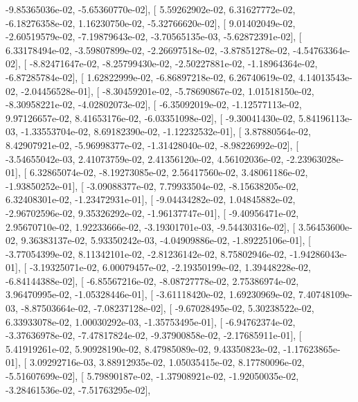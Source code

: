 \documentclass{article}
\begin{document}
         -9.85365036e-02,  -5.65360770e-02],
       [  5.59262902e-02,   6.31627772e-02,  -6.18276358e-02,
          1.16230750e-02,  -5.32766620e-02],
       [  9.01402049e-02,  -2.60519579e-02,  -7.19879643e-02,
         -3.70565135e-03,  -5.62872391e-02],
       [  6.33178494e-02,  -3.59807899e-02,  -2.26697518e-02,
         -3.87851278e-02,  -4.54763364e-02],
       [ -8.82471647e-02,  -8.25799430e-02,  -2.50227881e-02,
         -1.18964364e-02,  -6.87285784e-02],
       [  1.62822999e-02,  -6.86897218e-02,   6.26740619e-02,
          4.14013543e-02,  -2.04456528e-01],
       [ -8.30459201e-02,  -5.78690867e-02,   1.01518150e-02,
         -8.30958221e-02,  -4.02802073e-02],
       [ -6.35092019e-02,  -1.12577113e-02,   9.97126657e-02,
          8.41653176e-02,  -6.03351098e-02],
       [ -9.30041430e-02,   5.84196113e-03,  -1.33553704e-02,
          8.69182390e-02,  -1.12232532e-01],
       [  3.87880564e-02,   8.42907921e-02,  -5.96998377e-02,
         -1.31428040e-02,  -8.98226992e-02],
       [ -3.54655042e-03,   2.41073759e-02,   2.41356120e-02,
          4.56102036e-02,  -2.23963028e-01],
       [  6.32865074e-02,  -8.19273085e-02,   2.56417560e-02,
          3.48061186e-02,  -1.93850252e-01],
       [ -3.09088377e-02,   7.79933504e-02,  -8.15638205e-02,
          6.32408301e-02,  -1.23472931e-01],
       [ -9.04434282e-02,   1.04845882e-02,  -2.96702596e-02,
          9.35326292e-02,  -1.96137747e-01],
       [ -9.40956471e-02,   2.95670710e-02,   1.92233666e-02,
         -3.19301701e-03,  -9.54430316e-02],
       [  3.56453600e-02,   9.36383137e-02,   5.93350242e-03,
         -4.04909886e-02,  -1.89225106e-01],
       [ -3.77054399e-02,   8.11342101e-02,  -2.81236142e-02,
          8.75802946e-02,  -1.94286043e-01],
       [ -3.19325071e-02,   6.00079457e-02,  -2.19350199e-02,
          1.39448228e-02,  -6.84144388e-02],
       [ -6.85567216e-02,  -8.08727778e-02,   2.75386974e-02,
          3.96470995e-02,  -1.05328446e-01],
       [ -3.61118420e-02,   1.69230969e-02,   7.40748109e-03,
         -8.87503664e-02,  -7.08237128e-02],
       [ -9.67028495e-02,   5.30238522e-02,   6.33933078e-02,
          1.00030292e-03,  -1.35753495e-01],
       [ -6.94762374e-02,  -3.37636978e-02,  -7.47817824e-02,
         -9.37900858e-02,  -2.17685911e-01],
       [  5.41919261e-02,   5.90928190e-02,   8.47985089e-02,
          9.43350823e-02,  -1.17623865e-01],
       [  3.09292716e-03,   3.88912935e-02,   1.05035415e-02,
          8.17780096e-02,  -5.51607699e-02],
       [  5.79890187e-02,  -1.37908921e-02,  -1.92050035e-02,
         -3.28461536e-02,  -7.51763295e-02],
\end{document}
